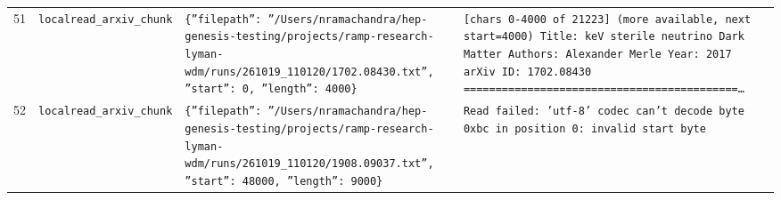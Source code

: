 \documentclass[11pt,a4paper]{article}
\begin{document}
\begin{longtable}{@{}p{}p{}p{}p{}@{}}
51 & \texttt{local}\newline\texttt{read\_\allowbreak{}arxiv\_\allowbreak{}chunk} & \texttt{\{''filepath'':\allowbreak{} ''/\allowbreak{}Users/\allowbreak{}nramachandra/\allowbreak{}hep-genesis-testing/\allowbreak{}projects/\allowbreak{}ramp-research-lyman-wdm/\allowbreak{}runs/\allowbreak{}261019\_\allowbreak{}110120/\allowbreak{}1702.08430.txt'',\allowbreak{} ''start'':\allowbreak{} 0,\allowbreak{} ''length'':\allowbreak{} 4000\}\allowbreak{}} & \texttt{[chars 0-4000 of 21223]\allowbreak{} (more available,\allowbreak{} next start=\allowbreak{}4000)\allowbreak{}  Title:\allowbreak{} keV sterile neutrino Dark Matter Authors:\allowbreak{} Alexander Merle Year:\allowbreak{} 2017 arXiv ID:\allowbreak{} 1702.08430  =\allowbreak{}=\allowbreak{}=\allowbreak{}=\allowbreak{}=\allowbreak{}=\allowbreak{}=\allowbreak{}=\allowbreak{}=\allowbreak{}=\allowbreak{}=\allowbreak{}=\allowbreak{}=\allowbreak{}=\allowbreak{}=\allowbreak{}=\allowbreak{}=\allowbreak{}=\allowbreak{}=\allowbreak{}=\allowbreak{}=\allowbreak{}=\allowbreak{}=\allowbreak{}=\allowbreak{}=\allowbreak{}=\allowbreak{}=\allowbreak{}=\allowbreak{}=\allowbreak{}=\allowbreak{}=\allowbreak{}=\allowbreak{}=\allowbreak{}=\allowbreak{}=\allowbreak{}=\allowbreak{}=\allowbreak{}=\allowbreak{}=\allowbreak{}=\allowbreak{}=\allowbreak{}=\allowbreak{}=\allowbreak{}\ldots{}\allowbreak{}} \\
52 & \texttt{local}\newline\texttt{read\_\allowbreak{}arxiv\_\allowbreak{}chunk} & \texttt{\{''filepath'':\allowbreak{} ''/\allowbreak{}Users/\allowbreak{}nramachandra/\allowbreak{}hep-genesis-testing/\allowbreak{}projects/\allowbreak{}ramp-research-lyman-wdm/\allowbreak{}runs/\allowbreak{}261019\_\allowbreak{}110120/\allowbreak{}1908.09037.txt'',\allowbreak{} ''start'':\allowbreak{} 48000,\allowbreak{} ''length'':\allowbreak{} 9000\}\allowbreak{}} & \texttt{Read failed:\allowbreak{} 'utf-8' codec can't decode byte 0xbc in position 0:\allowbreak{} invalid start byte} \\

\end{longtable}
\end{document}
